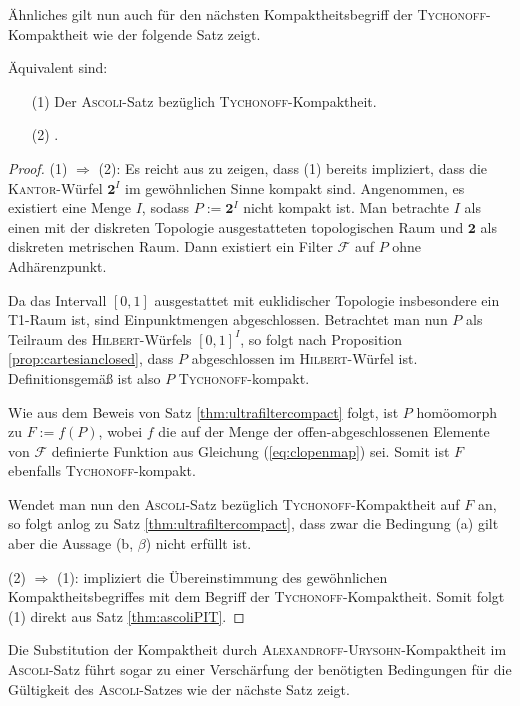 Ähnliches gilt nun auch für den nächsten Kompaktheitsbegriff der \textsc{Tychonoff}\hyp{}Kompaktheit wie der folgende Satz zeigt.

\begin{thm}
  Äquivalent sind:
  \begin{enumerate}
    \item[(1)] Der \textsc{Ascoli}-Satz bezüglich \textsc{\textsc{Tychonoff}}\hyp{}Kompaktheit.
    \item[(2)] \PIT.
  \end{enumerate}
\end{thm}

\begin{proof}
  (1) $\Rightarrow$ (2): Es reicht aus zu zeigen, dass (1) bereits impliziert, dass die \textsc{Kantor}\hyp{}Würfel $\mathbf{2}^I$ im gewöhnlichen Sinne kompakt sind.
  Angenommen, es existiert eine Menge $I$, sodass $P:= \mathbf{2}^I$ nicht kompakt ist.
  Man betrachte $I$ als einen mit der diskreten Topologie ausgestatteten topologischen Raum und $\mathbf{2}$ als diskreten metrischen Raum.
  Dann existiert ein Filter $\mathcal{F}$ auf $P$ ohne Adhärenzpunkt.

  Da das Intervall $[0,1]$ ausgestattet mit euklidischer Topologie insbesondere ein T1\hyp{}Raum ist, sind Einpunktmengen abgeschlossen.
  Betrachtet man nun $P$ als Teilraum des \textsc{Hilbert}\hyp{}Würfels $[0,1]^I$, so folgt nach Proposition \ref{prop:cartesianclosed}, dass $P$ abgeschlossen im \textsc{Hilbert}\hyp{}Würfel ist.
  Definitionsgemäß ist also $P$ \textsc{Tychonoff}\hyp{}kompakt.

  Wie aus dem Beweis von Satz \ref{thm:ultrafiltercompact} folgt, ist $P$ homöomorph zu $F:= f(P)$, wobei $f$ die auf der Menge der offen\hyp{}abgeschlossenen Elemente von $\mathcal{F}$ definierte Funktion aus Gleichung (\ref{eq:clopenmap}) sei.
  Somit ist $F$ ebenfalls \textsc{Tychonoff}\hyp{}kompakt.

  Wendet man nun den \textsc{Ascoli}\hyp{}Satz bezüglich \textsc{Tychonoff}\hyp{}Kompaktheit auf $F$ an, so folgt anlog zu Satz \ref{thm:ultrafiltercompact}, dass zwar die Bedingung (a) gilt aber die Aussage (b, $\beta$) nicht erfüllt ist.

  (2) $\Rightarrow$ (1): \PIT impliziert die Übereinstimmung des gewöhnlichen Kompaktheitsbegriffes mit dem Begriff der \textsc{Tychonoff}\hyp{}Kompaktheit. Somit folgt (1) direkt aus Satz \ref{thm:ascoliPIT}.
\end{proof}

Die Substitution der Kompaktheit durch \textsc{Alexandroff}\hyp{}\textsc{Urysohn}\hyp{}Kompaktheit im \textsc{Ascoli}\hyp{}Satz führt sogar zu einer Verschärfung der benötigten Bedingungen für die Gültigkeit des \textsc{Ascoli}\hyp{}Satzes wie der nächste Satz zeigt.

